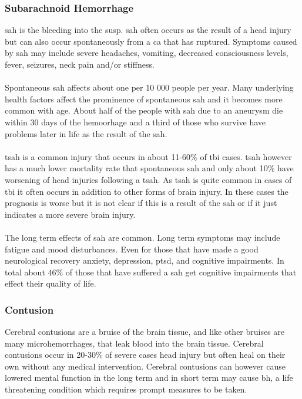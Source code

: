 \documentclass[11pt]{article}
\begin{document}
\subsubsection{Subarachnoid Hemorrhage}
\gls{sah} is the bleeding into the \gls{susp}. \gls{sah} often occurs as the result of a head injury but can also occur spontaneously from a \gls{ca} that has ruptured. Symptoms caused by \gls{sah} may include severe headaches, vomiting, decreased consciousness levels, fever, seizures, neck pain and/or stiffness.\cite{SubarachnoidHemorrhage2021}\\
\\
Spontaneous \gls{sah} affects about one per 10 000 people per year. Many underlying health factors affect the prominence of spontaneous \gls{sah} and it becomes more common with age. About half of the people with \gls{sah} due to an aneurysm die within 30 days of the hemoorhage and a third of those who survive have problems later in life as the result of the \gls{sah}.\cite{SubarachnoidHemorrhage2021}\\
\\
\Gls{tsah} is a common injury that occurs in about 11-60\% of \gls{tbi} cases\cite{knipeTraumaticSubarachnoidHemorrhage}. \gls{tsah} however has a much lower mortality rate that spontaneous \gls{sah} and only about 10\% have worsening of head injuries following a \gls{tsah}\cite{cooperManagementTraumaticSubarachnoid2019}. As \gls{tsah} is quite common in cases of \gls{tbi} it often occurs in addition to other forms of brain injury. In these cases the prognosis is worse but it is not clear if this is a result of the \gls{sah} or if it just indicates a more severe brain injury.\cite{SubarachnoidHemorrhage2021}\\
\\
The long term effects of \gls{sah} are common. Long term symptoms may include fatigue and mood disturbances. Even for those that have made a good neurological recovery anxiety, depression, \gls{ptsd}, and cognitive impairments. In total about 46\% of those that have suffered a \gls{sah} get cognitive impairments that effect their quality of life.\cite{SubarachnoidHemorrhage2021}

\subsubsection{Contusion}
Cerebral contusions are a bruise of the brain tissue, and like other bruises are many microhemorrhages, that leak blood into the brain tissue. Cerebral contusions occur in 20-30\% of severe cases head injury but often heal on their own without any medical intervention. Cerebral contusions can however cause lowered mental function in the long term and in short term may cause \gls{bh}, a life threatening condition which requires prompt measures to be taken\cite{BrainHerniation2020}.\cite{CerebralContusion2020}
\end{document}
